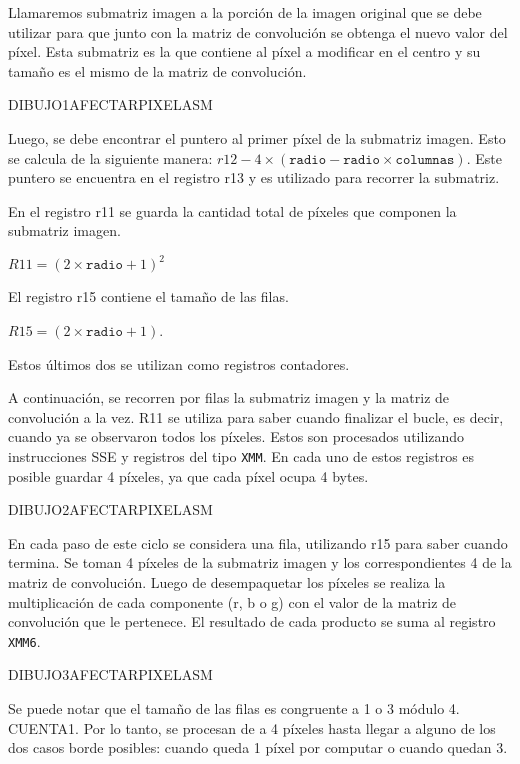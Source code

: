         Llamaremos submatriz imagen a la porción de la imagen original que se debe utilizar para que junto con la matriz de convolución se obtenga el nuevo valor del píxel. Esta submatriz es la que contiene al píxel a modificar en el centro y su tamaño es el mismo de la matriz de convolución. 
        
        DIBUJO1AFECTARPIXELASM

        Luego, se debe encontrar el puntero al primer píxel de la submatriz imagen. Esto se calcula de la siguiente manera: $r12 - 4 \times (\mathtt{radio} - \mathtt{radio} \times \mathtt{columnas})$. Este puntero se encuentra en el registro r13 y es utilizado para recorrer la submatriz. 

        En el registro r11 se guarda la cantidad total de píxeles que componen la submatriz imagen. 

              $R11 = (2 \times \mathtt{radio} + 1)^{2}$  
        
        El registro r15 contiene el tamaño de las filas.
        
              $R15 =(2 \times \mathtt{radio}  + 1)$.

        Estos últimos dos se utilizan como registros contadores.

        A continuación, se recorren por filas la submatriz imagen y la matriz de convolución a la vez. R11 se utiliza para saber cuando finalizar el bucle, es decir, cuando ya se observaron todos los píxeles. Estos son procesados utilizando instrucciones SSE y registros del tipo \texttt{XMM}. En cada uno de estos registros es posible guardar 4 píxeles, ya que cada píxel ocupa 4 bytes. 

        DIBUJO2AFECTARPIXELASM
  
        En cada paso de este ciclo se considera una fila, utilizando r15 para saber cuando termina. Se toman 4 píxeles de la submatriz imagen y los correspondientes 4 de la matriz de convolución. Luego de desempaquetar los píxeles se realiza la multiplicación de cada componente (r, b o g) con el valor de la matriz de convolución que le pertenece. El resultado de cada producto se suma al registro \texttt{XMM6}. 

        DIBUJO3AFECTARPIXELASM  

        Se puede notar que el tamaño de las filas es congruente a 1 o 3 módulo 4. 
        CUENTA1. Por lo tanto, se procesan de a 4 píxeles hasta llegar a alguno de los dos casos borde posibles: cuando queda 1 píxel por computar o cuando quedan 3. 
        

